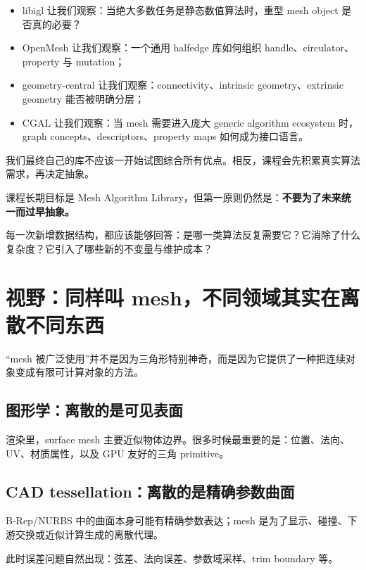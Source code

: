 \documentclass[UTF8,11pt]{ctexart}
\begin{document}
\begin{itemize}
  \item libigl 让我们观察：当绝大多数任务是静态数值算法时，重型 mesh object 是否真的必要？
  \item OpenMesh 让我们观察：一个通用 halfedge 库如何组织 handle、circulator、property 与 mutation；
  \item geometry-central 让我们观察：connectivity、intrinsic geometry、extrinsic geometry 能否被明确分层；
  \item CGAL 让我们观察：当 mesh 需要进入庞大 generic algorithm ecosystem 时，graph concepts、descriptors、property maps 如何成为接口语言。
\end{itemize}

我们最终自己的库不应该一开始试图综合所有优点。相反，课程会先积累真实算法需求，再决定抽象。

\begin{keyidea}[：接口应由算法压力长出来]
课程长期目标是 Mesh Algorithm Library，但第一原则仍然是：\textbf{不要为了未来统一而过早抽象。}

每一次新增数据结构，都应该能够回答：是哪一类算法反复需要它？它消除了什么复杂度？它引入了哪些新的不变量与维护成本？
\end{keyidea}

\section{视野：同样叫 mesh，不同领域其实在离散不同东西}

“mesh 被广泛使用”并不是因为三角形特别神奇，而是因为它提供了一种把连续对象变成有限可计算对象的方法。

\subsection{图形学：离散的是可见表面}

渲染里，surface mesh 主要近似物体边界。很多时候最重要的是：位置、法向、UV、材质属性，以及 GPU 友好的三角 primitive。

\subsection{CAD tessellation：离散的是精确参数曲面}

B-Rep/NURBS 中的曲面本身可能有精确参数表达；mesh 是为了显示、碰撞、下游交换或近似计算生成的离散代理。

此时误差问题自然出现：弦差、法向误差、参数域采样、trim boundary 等。
\end{document}
